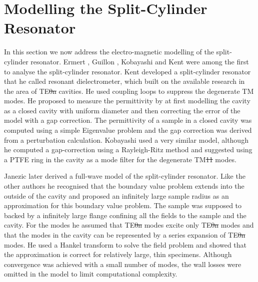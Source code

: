 \section{Modelling the Split-Cylinder Resonator}\label{sec:modelling}
In this section we now address the electro-magnetic modelling of the split-cylinder resonator. Ermert \cite{ermert}, Guillon \cite{guillon}, Koba\-yashi \cite{kobayashi} and Kent \cite{kent1996} were among the first to analyse the split-cylinder resonator. Kent developed a split-cylinder resonator that he called resonant dielectrometer, which built on the available research in the area of TE\st{0n} cavities. He used coupling loops to suppress the degenerate TM modes. He proposed to measure the permittivity by at first modelling the cavity as a closed cavity with uniform diameter and then correcting the error of the model with a gap correction. The permittivity of a sample in a closed cavity was computed using a simple Eigenvalue problem and the gap correction was derived from a perturbation calculation. \cite{kent1996gap} Kobayashi used a very similar model, although he computed a gap-correction using a Rayleigh-Ritz method and suggested using a PTFE ring in the cavity as a mode filter for the degenerate TM\st{11} modes.

Janezic \cite{janezic1999} later derived a full-wave model of the split-cylinder resonator. Like the other authors he recognised that the boundary value problem extends into the outside of the cavity and proposed an infinitely large sample radius as an approximation for this boundary value problem. The sample was supposed to backed by a infinitely large flange confining all the fields to the sample and the cavity. For the modes he assumed that TE\st{0n} modes excite only TE\st{0n} modes and that the modes in the cavity can be represented by a series expansion of TE\st{0n} modes. He used a Hankel transform to solve the field problem and showed that the approximation is correct for relatively large, thin specimens. Although convergence was achieved with a small number of modes, the wall losses were omitted in the model to limit computational complexity. 

